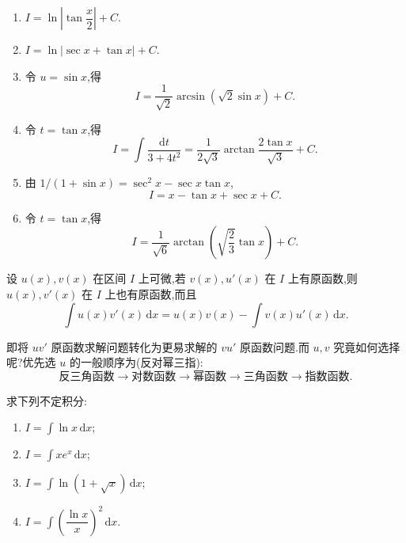 \begin{solution}
    \begin{enumerate}
        \item $\displaystyle I=\ln\left|\tan\dfrac{x}{2}\right|+C$.
        \item $\displaystyle I=\ln|\sec x+\tan x|+C$.
        \item 令 $u=\sin x$,得
              \[
                  I=\dfrac{1}{\sqrt2}\arcsin(\sqrt2\sin x)+C.
              \]
        \item 令 $t=\tan x$,得
              \[
                  I=\int\dfrac{\mathrm{d}t}{3+4t^2}
                  =\dfrac{1}{2\sqrt3}\arctan\dfrac{2\tan x}{\sqrt3}+C.
              \]
        \item 由 $1/(1+\sin x)=\sec^2x-\sec x\tan x$,
              \[
                  I=x-\tan x+\sec x+C.
              \]
        \item 令 $t=\tan x$,得
              \[
                  I=\dfrac{1}{\sqrt6}\arctan\left(\sqrt{\dfrac{2}{3}}\tan x\right)+C.
              \]
    \end{enumerate}
\end{solution}

\begin{theorem}
    设 $u(x),v(x)$ 在区间 $I$ 上可微,若 $v(x),u'(x)$ 在 $I$ 上有原函数,则 $u(x),v'(x)$ 在 $I$ 上也有原函数,而且
    \[
        \int u(x)v'(x)\,\mathrm{d}x
        =u(x)v(x)-\int v(x)u'(x)\,\mathrm{d}x.
    \]
\end{theorem}

\begin{remark}
    即将 $uv'$ 原函数求解问题转化为更易求解的 $vu'$ 原函数问题.而 $u,v$ 究竟如何选择呢?优先选 $u$ 的一般顺序为(反对幂三指):
    \[
        \text{反三角函数}\longrightarrow\text{对数函数}\longrightarrow\text{幂函数}
        \longrightarrow\text{三角函数}\longrightarrow\text{指数函数}.
    \]
\end{remark}

\begin{example}
    求下列不定积分:
    \begin{enumerate}
        \item $\displaystyle I=\int\ln x\,\mathrm{d}x$;
        \item $\displaystyle I=\int xe^x\,\mathrm{d}x$;
        \item $\displaystyle I=\int\ln(1+\sqrt{x})\,\mathrm{d}x$;
        \item $\displaystyle I=\int\left(\dfrac{\ln x}{x}\right)^2\,\mathrm{d}x$.
    \end{enumerate}
\end{example}
\exampleblank

